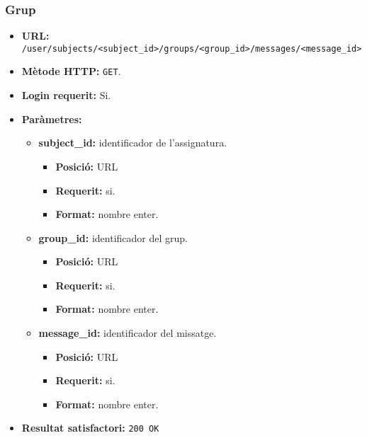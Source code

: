 	\subsubsection{Grup}
	\begin{itemize}
	\item \textbf{\ac{URL}:} \texttt{/user/subjects/<subject\_id>/groups/<group\_id>/messages/<message\_id>}
	\item \textbf{Mètode \ac{HTTP}: } \texttt{GET}.
	\item \textbf{Login requerit:} Si.
	\item \textbf{Paràmetres:}
	\begin{itemize}
		\item \textbf{subject\_id:} identificador de l'assignatura.
		\begin{itemize}
			\item \textbf{Posició:} \ac{URL}
			\item \textbf{Requerit:} si.
			\item \textbf{Format:} nombre enter.
		\end{itemize}
		\item \textbf{group\_id:} identificador del grup.
		\begin{itemize}
			\item \textbf{Posició:} \ac{URL}
			\item \textbf{Requerit:} si.
			\item \textbf{Format:} nombre enter.
		\end{itemize}
		\item \textbf{message\_id:} identificador del missatge.
		\begin{itemize}
			\item \textbf{Posició:} \ac{URL}
			\item \textbf{Requerit:} si.
			\item \textbf{Format:} nombre enter.
		\end{itemize}
	\end{itemize}
	\item \textbf{Resultat satisfactori:} \texttt{200 OK}
	\begin{verbatim}
	

\end{verbatim}
\end{itemize}
